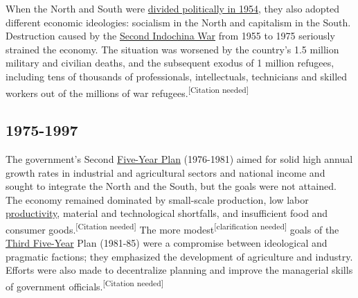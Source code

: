 \documentclass{article}
\begin{document}
When the North and South were \href{https://en.wikipedia.org/wiki/Geneva_Conference_(1954)}{divided politically in 1954}, they also adopted different economic ideologies: socialism in the North and capitalism in the South. Destruction caused by the \href{https://en.wikipedia.org/wiki/Second_Indochina_War}{Second Indochina War} from 1955 to 1975 seriously strained the economy. The situation was worsened by the country's 1.5 million military and civilian deaths, and the subsequent exodus of 1 million refugees, including tens of thousands of professionals, intellectuals, technicians and skilled workers out of the millions of war refugees.\textsuperscript{[Citation needed]}
\begin{figure}[H]
\end{figure}

\subsection*{1975-1997}
The government's Second \href{https://en.wikipedia.org/wiki/Five-Year_Plans_of_Vietnam#The_Second_Five-Year_Plan_(1976%E2%80%9380)}{Five-Year Plan} (1976-1981) aimed for solid high annual growth rates in industrial and agricultural sectors and national income and sought to integrate the North and the South, but the goals were not attained. The economy remained dominated by small-scale production, low labor \href{https://en.wikipedia.org/wiki/Productivity}{productivity}, material and technological shortfalls, and insufficient food and consumer goods.\textsuperscript{[Citation needed]} The more modest\textsuperscript{[clarification needed]} goals of the \href{https://en.wikipedia.org/wiki/Five-year_plans_of_Vietnam#The_Third_Five_Year_Plan_(1981%E2%80%9385)}{Third Five-Year} Plan (1981-85) were a compromise between ideological and pragmatic factions; they emphasized the development of agriculture and industry. Efforts were also made to decentralize planning and improve the managerial skills of government officials.\textsuperscript{[Citation needed]}
\end{document}
